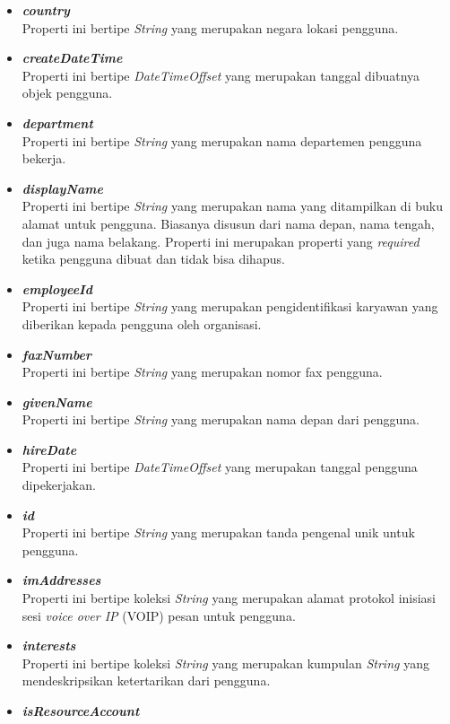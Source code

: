 \begin{itemize}
	\item \textbf{\textit{country}}\\
	Properti ini bertipe \textit{String} yang merupakan negara lokasi pengguna.
	\item \textbf{\textit{createDateTime}}\\
	Properti ini bertipe \textit{DateTimeOffset} yang merupakan tanggal dibuatnya objek pengguna.
	\item \textbf{\textit{department}}\\
	Properti ini bertipe \textit{String} yang merupakan nama departemen pengguna bekerja.
	\item \textbf{\textit{displayName}}\\
	Properti ini bertipe \textit{String} yang merupakan nama yang ditampilkan di buku alamat untuk pengguna. Biasanya disusun dari nama depan, nama tengah, dan juga nama belakang. Properti ini merupakan properti yang \textit{required} ketika pengguna dibuat dan tidak bisa dihapus. 
	 \item \textbf{\textit{employeeId}}\\
	Properti ini bertipe \textit{String} yang merupakan pengidentifikasi karyawan yang diberikan kepada pengguna oleh organisasi.
	\item \textbf{\textit{faxNumber}}\\
	Properti ini bertipe \textit{String} yang merupakan nomor fax pengguna.
	\item \textbf{\textit{givenName}}\\
	Properti ini bertipe \textit{String} yang merupakan nama depan dari pengguna.
	\item \textbf{\textit{hireDate}}\\
	Properti ini bertipe \textit{DateTimeOffset} yang merupakan tanggal pengguna dipekerjakan.
	\item \textbf{\textit{id}}\\
	Properti ini bertipe \textit{String} yang merupakan tanda pengenal unik untuk pengguna.
	\item \textbf{\textit{imAddresses}}\\
	Properti ini bertipe koleksi \textit{String} yang merupakan alamat protokol inisiasi sesi \textit{voice over IP} (VOIP) pesan untuk pengguna.
	\item \textbf{\textit{interests}}\\
	Properti ini bertipe koleksi \textit{String} yang merupakan kumpulan \textit{String} yang mendeskripsikan ketertarikan dari pengguna.
	\item \textbf{\textit{isResourceAccount}}\\

\end{itemize}
